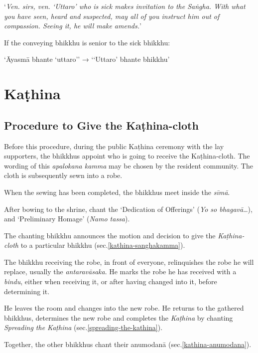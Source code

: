 ‘\emph{Ven. sirs, ven. ‘Uttaro’ who is sick makes invitation to the Saṅgha. With
  what you have seen, heard and suspected, may all of you instruct him out of
  compassion. Seeing it, he will make amends.}’

If the conveying bhikkhu is senior to the sick bhikkhu:

‘Āyasmā bhante ‘uttaro’’ → ‘‘Uttaro’ bhante bhikkhu’


\ifreferenceedition
\clearpage
\fi

\section{Kaṭhina}

\subsection{Procedure to Give the Kaṭhina-cloth}

Before this procedure, during the public Kaṭhina ceremony with the lay
supporters, the bhikkhus appoint who is going to receive the Kaṭhina-cloth. The
wording of this \emph{apalokana kamma} may be chosen by the resident community.
The cloth is subsequently sewn into a robe.

When the sewing has been completed, the bhikkhus meet inside the \emph{sīmā}.

After bowing to the shrine, chant the `Dedication of Offerings' (\emph{Yo so
  bhagavā}\ldots), and `Preliminary Homage' (\emph{Namo tassa}).

The chanting bhikkhu announces the motion and decision to give the
\emph{Kaṭhina-cloth} to a particular bhikkhu (sec.\ref{kathina-sanghakamma}).

The bhikkhu receiving the robe, in front of everyone, relinquishes the robe he
will replace, usually the \emph{antaravāsaka}. He marks the robe he has received
with a \emph{bindu}, either when receiving it, or after having changed into it, before determining it.

He leaves the room and changes into the new robe. He returns to the
gathered bhikkhus, determines the new robe and completes the \emph{Kaṭhina} by
chanting \emph{Spreading the Kaṭhina} (sec.\ref{spreading-the-kathina}).

Together, the other bhikkhus chant their anumodanā (sec.\ref{kathina-anumodana}).

\ifhandbookedition
\clearpage
\fi

